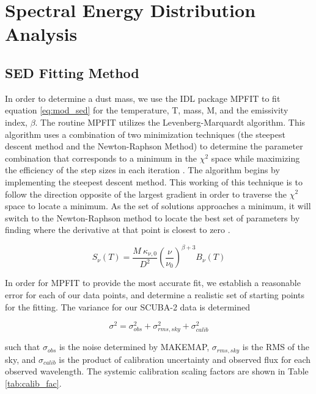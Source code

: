 \chapter{Spectral Energy Distribution Analysis}

\section{SED Fitting Method}

In order to determine a dust mass, we use the IDL package MPFIT \citep{markwardt2009} to fit equation \ref{eq:mod_sed} for the temperature, T, mass, M, and the emissivity index, $\beta$.  The routine MPFIT utilizes the Levenberg-Marquardt algorithm.  This algorithm uses a combination of two minimization techniques (the steepest descent method and the Newton-Raphson Method) to determine the parameter combination that corresponds to a minimum in the $\chi^2$ space while maximizing the efficiency of the step sizes in each iteration \citep{burden2001}.  The algorithm begins by implementing the steepest descent method.  This working of this technique is to follow the direction opposite of the largest gradient in order to traverse the $\chi^2$ space to locate a minimum.  As the set of solutions approaches a minimum, it will switch to the Newton-Raphson method to locate the best set of parameters by finding where the derivative at that point is closest to zero \citep{gavin2013}.  

\begin{equation}\label{eq:mod_sed}
  S_\nu\left(T\right) = \frac{M\:\kappa_{\nu,0}}{D^2}\left(\frac{\nu}{\nu_0}\right)^{\beta+3} B_\nu\left(T\right)
\end{equation}

In order for MPFIT to provide the most accurate fit, we establish a reasonable error for each of our data points, and determine a realistic set of starting points for the fitting.  The variance for our SCUBA-2 data is determined 

\begin{equation}\label{eq:sc2noi}
  \sigma^2 = \sigma_{obs}^2 + \sigma_{rms,sky}^2 + \sigma_{calib}^2
\end{equation}

\noindent such that $\sigma_{obs}$ is the noise determined by MAKEMAP, $\sigma_{rms,sky}$ is the RMS of the sky, and $\sigma_{calib}$ is the product of calibration uncertainty and observed flux for each observed wavelength.  The systemic calibration scaling factors are shown in Table \ref{tab:calib_fac}.

